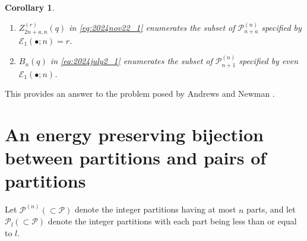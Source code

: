 \documentclass[sn-mathphys-num]{sn-jnl}%
\theoremstyle{thmstyleone}%
\theoremstyle{thmstyletwo}%
\theoremstyle{thmstylethree}%
\newtheorem{corollary}[theorem]{Corollary}
\begin{document}
\begin{corollary}
\par\noindent
\begin{enumerate}
\item $Z_{2n+a,n}^{(r)}(q) $ in \eqref{eq:2024nov22_1} enumerates 
the subset of $\mathscr{P}^{(n)}_{n+a}$ specified by $\mathcal{E}_1 (\bullet; n) = r$.
\item $B_n(q)$ in \eqref{eq:2024july2_1} enumerates 
the subset of $\mathscr{P}^{(n)}_{n+1}$ specified by even $\mathcal{E}_1 (\bullet; n)$.
\end{enumerate}
\end{corollary}
This provides an answer to the problem posed by
Andrews and Newman \cite[p.~9, Question II (3)]{AN2020}.


\section{An energy preserving bijection between partitions and pairs of partitions}\label{sec6}
Let $\mathscr{P}^{(n)} (\subset \mathscr{P})$ denote the integer partitions having at most $n$ parts, and let
$\mathscr{P}_l (\subset \mathscr{P})$ denote the integer partitions with each part
being less than or equal to $l$.
\end{document}
